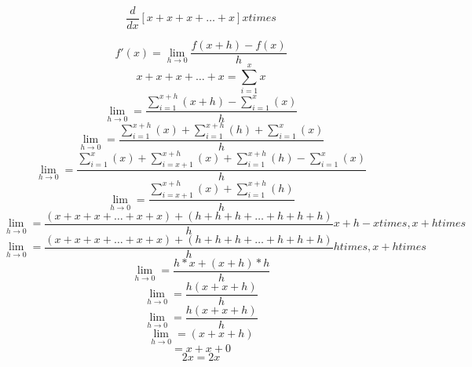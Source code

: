 \documentclass{article}
\begin{document}
\begin{answer}
    \item
    \begin{equation}
        \frac{d}{dx}[x+x+x+ \ldots +x] x times
    \end{equation}

    \begin{equation}
    f'(x)=\lim_{h\to0}\frac{f(x+h)-f(x)}{h}
  \end{equation}
  \begin{equation}
    x+x+x+\ldots+x =\sum_{i=1}^{x} x 
  \end{equation}
  \begin{equation}
    \lim_{h\to0}=\frac{\sum_{i=1}^{x+h} (x+h)-\sum_{i=1}^{x}(x)}{h}
  \end{equation}
  \begin{equation}
    \lim_{h\to0}=\frac{\sum_{i=1}^{x+h}(x)+\sum_{i=1}^{x+h}(h)+\sum_{i=1}^{x}(x)}{h}
  \end{equation}
  \begin{equation}
    \lim_{h\to0}=\frac{\sum_{i=1}^{x}(x) + \sum_{i=x+1}^{x+h}(x)+\sum_{i=1}^{x+h}(h)-\sum_{i=1}^{x}(x)}{h}
  \end{equation}
  \begin{equation}
    \lim_{h\to0}=\frac{\sum_{i=x+1}^{x+h}(x)  + \sum_{i=1}^{x+h}(h)}{h}
  \end{equation}
  \begin{equation}
    \lim_{h\to0}=\frac{(x+x+x+\ldots+x+x)+(h+h+h+\ldots+h+h+h)}{h} x+h-x times, x+h times
  \end{equation}
  \begin{equation}
    \lim_{h\to0}=\frac{(x+x+x+\ldots+x+x)+(h+h+h+\ldots+h+h+h)}{h} h times, x+h times
  \end{equation}
  \begin{equation}
    \lim_{h\to0}=\frac{h*x+(x+h)*h}{h}
  \end{equation}
  \begin{equation}
    \lim_{h\to0}=\frac{h(x+x+h)}{h}
  \end{equation}
  \begin{equation}
    \lim_{h\to0}=\frac{h(x+x+h)}{h}
  \end{equation}
  \begin{equation}
    \lim_{h\to0}=(x+x+h)
  \end{equation}
  \begin{equation}
    =x+x+0
  \end{equation}
  \begin{equation}
    2x=2x
  \end{equation}
\end{answer}
\end{document}
